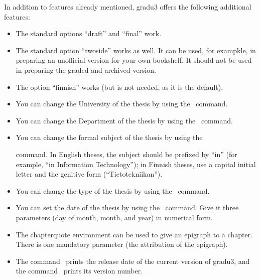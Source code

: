 \documentclass[utf8,english]{gradu3}
\begin{document}
In addition to features already mentioned, gradu3 offers the following
additional features:
\begin{itemize}
\item The standard options ``draft'' and ``final''  work.
\item The standard option ``twoside'' works as well.  It can be used,
  for exampkle, in preparing an unofficial version for your own
  bookshelf.  It should not be used in preparing the graded and
  archived version.
\item The option ``finnish'' works (but is not needed, as it is the default).
\item You can change the University of the thesis by using the
  \string\university\ command.
\item You can change the Department of the thesis by using the
  \string\department\ command.
\item You can change the formal subject of the thesis by using the
  \string\subject\ command.  In English theses, the subject should be
  prefixed by ``in'' (for example, ``in Information Technology''); in
  Finnish theses, use a capital initial letter and the genitive form
  (``Tietotekniikan'').
\item You can change the type of the thesis by using the \string\type\
  command.
\item You can set the date of the thesis by using the \string\setdate\
  command.  Give it three parameters (day of month, month, and year)
  in numerical form.
\item The chapterquote environment can be used to give an epigraph to
  a chapter.  There is one mandatory parameter (the attribution of the
  epigraph).
\item The command \string\graduclsdate\ prints the release date of the
  current version of gradu3, and the command \string\graduclsversion\
  prints its version number.
\end{itemize}
\end{document}
